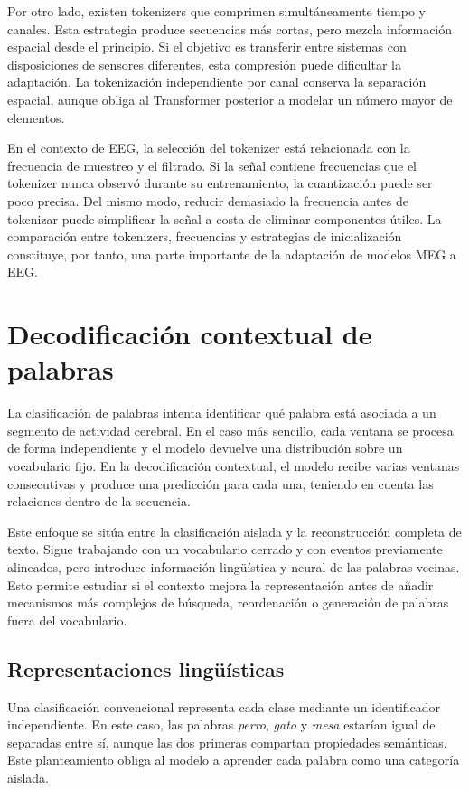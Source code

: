 Por otro lado, existen tokenizers que comprimen simultáneamente tiempo y canales. Esta estrategia produce secuencias más cortas, pero mezcla información espacial desde el principio. Si el objetivo es transferir entre sistemas con disposiciones de sensores diferentes, esta compresión puede dificultar la adaptación. La tokenización independiente por canal conserva la separación espacial, aunque obliga al Transformer posterior a modelar un número mayor de elementos.

En el contexto de EEG, la selección del tokenizer está relacionada con la frecuencia de muestreo y el filtrado. Si la señal contiene frecuencias que el tokenizer nunca observó durante su entrenamiento, la cuantización puede ser poco precisa. Del mismo modo, reducir demasiado la frecuencia antes de tokenizar puede simplificar la señal a costa de eliminar componentes útiles. La comparación entre tokenizers, frecuencias y estrategias de inicialización constituye, por tanto, una parte importante de la adaptación de modelos MEG a EEG.

\section{Decodificación contextual de palabras}

La clasificación de palabras intenta identificar qué palabra está asociada a un segmento de actividad cerebral. En el caso más sencillo, cada ventana se procesa de forma independiente y el modelo devuelve una distribución sobre un vocabulario fijo. En la decodificación contextual, el modelo recibe varias ventanas consecutivas y produce una predicción para cada una, teniendo en cuenta las relaciones dentro de la secuencia.

Este enfoque se sitúa entre la clasificación aislada y la reconstrucción completa de texto. Sigue trabajando con un vocabulario cerrado y con eventos previamente alineados, pero introduce información lingüística y neural de las palabras vecinas. Esto permite estudiar si el contexto mejora la representación antes de añadir mecanismos más complejos de búsqueda, reordenación o generación de palabras fuera del vocabulario.

\subsection{Representaciones lingüísticas}

Una clasificación convencional representa cada clase mediante un identificador independiente. En este caso, las palabras \textit{perro}, \textit{gato} y \textit{mesa} estarían igual de separadas entre sí, aunque las dos primeras compartan propiedades semánticas. Este planteamiento obliga al modelo a aprender cada palabra como una categoría aislada.

